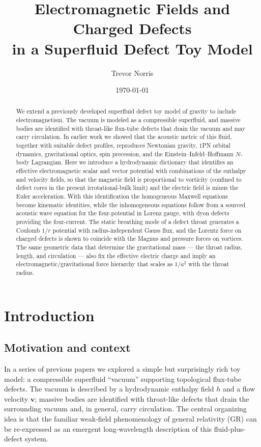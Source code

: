 \documentclass[11pt]{article}
\title{Electromagnetic Fields and Charged Defects\\
in a Superfluid Defect Toy Model}
\author{Trevor Norris}
\date{\today}
\begin{document}
\maketitle

\begin{abstract}
We extend a previously developed superfluid defect toy model of gravity to include electromagnetism.  The vacuum is modeled as a compressible superfluid, and massive bodies are identified with throat-like flux-tube defects that drain the vacuum and may carry circulation.  In earlier work we showed that the acoustic metric of this fluid, together with suitable defect profiles, reproduces Newtonian gravity, $1$PN orbital dynamics, gravitational optics, spin precession, and the Einstein--Infeld--Hoffmann $N$-body Lagrangian.  Here we introduce a hydrodynamic dictionary that identifies an effective electromagnetic scalar and vector potential with combinations of the enthalpy and velocity fields, so that the magnetic field is proportional to vorticity (confined to defect cores in the present irrotational-bulk limit) and the electric field is minus the Euler acceleration.  With this identification the homogeneous Maxwell equations become kinematic identities, while the inhomogeneous equations follow from a sourced acoustic wave equation for the four-potential in Lorenz gauge, with dyon defects providing the four-current.  The static breathing mode of a defect throat generates a Coulomb $1/r$ potential with radius-independent Gauss flux, and the Lorentz force on charged defects is shown to coincide with the Magnus and pressure forces on vortices.  The same geometric data that determine the gravitational mass --- the throat radius, length, and circulation --- also fix the effective electric charge and imply an electromagnetic/gravitational force hierarchy that scales as $1/a^2$ with the throat radius.
\end{abstract}

\section{Introduction}
\label{sec:intro}

\subsection{Motivation and context}

In a series of previous papers \cite{Norris:2025Orbits,Norris:Paper2,Norris:Paper3} we explored a simple but surprisingly rich toy model: a compressible superfluid ``vacuum'' supporting topological flux-tube defects.  The vacuum is described by a hydrodynamic enthalpy field $h$ and a flow velocity $\mathbf{v}$; massive bodies are identified with throat-like defects that drain the surrounding vacuum and, in general, carry circulation.  The central organizing idea is that the familiar weak-field phenomenology of general relativity (GR) can be re-expressed as an emergent long-wavelength description of this fluid-plus-defect system.
\end{document}
